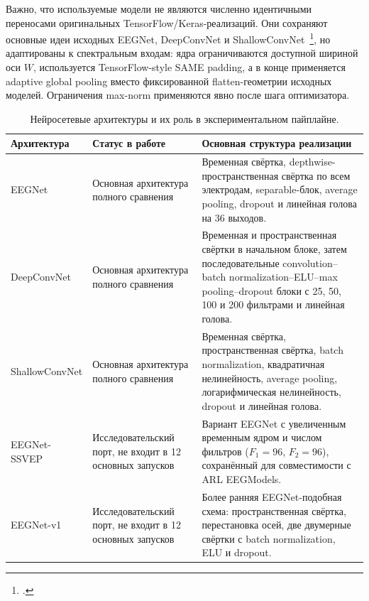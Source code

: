 Важно, что используемые модели не являются численно идентичными переносами
оригинальных TensorFlow/Keras-реализаций. Они сохраняют основные идеи
исходных EEGNet, DeepConvNet и ShallowConvNet~\footcite{10.1088/1741-2552/aace8c,10.1002/hbm.23730},
но адаптированы к спектральным входам: ядра ограничиваются доступной шириной
оси $W$, используется TensorFlow-style SAME padding, а в конце применяется
adaptive global pooling вместо фиксированной flatten-геометрии исходных
моделей. Ограничения max-norm применяются явно после шага оптимизатора.

\begin{table}[!t]
  \centering
  \small
  \setlength{\tabcolsep}{3pt}
  \renewcommand{\arraystretch}{1.15}
  \caption{Нейросетевые архитектуры и их роль в экспериментальном пайплайне.}
  \label{tab:deep-architecture-summary}
  \begin{tabularx}{\textwidth}{|L{34mm}|L{38mm}|Y|}
    \hline
    Архитектура & Статус в работе & Основная структура реализации \\
    \hline
    EEGNet & Основная архитектура полного сравнения &
    Временная свёртка, depthwise-пространственная свёртка по всем электродам,
    separable-блок, average pooling, dropout и линейная голова на 36 выходов. \\
    \hline
    DeepConvNet & Основная архитектура полного сравнения &
    Временная и пространственная свёртки в начальном блоке, затем
    последовательные convolution--batch normalization--ELU--max pooling--dropout
    блоки с 25, 50, 100 и 200 фильтрами и линейная голова. \\
    \hline
    ShallowConvNet & Основная архитектура полного сравнения &
    Временная свёртка, пространственная свёртка, batch normalization,
    квадратичная нелинейность, average pooling, логарифмическая нелинейность,
    dropout и линейная голова. \\
    \hline
    EEGNet-SSVEP & Исследовательский порт, не входит в 12 основных запусков &
    Вариант EEGNet с увеличенным временным ядром и числом фильтров
    ($F_1=96$, $F_2=96$), сохранённый для совместимости с ARL EEGModels. \\
    \hline
    EEGNet-v1 & Исследовательский порт, не входит в 12 основных запусков &
    Более ранняя EEGNet-подобная схема: пространственная свёртка, перестановка
    осей, две двумерные свёртки с batch normalization, ELU и dropout. \\
    \hline
  \end{tabularx}
\end{table}

